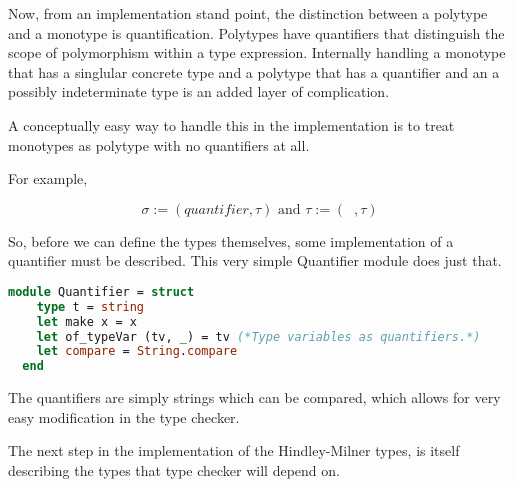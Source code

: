 \documentclass{l4proj}
\begin{document}


Now, from an implementation stand point, the distinction between a polytype and a monotype is quantification.
Polytypes have quantifiers that distinguish the scope of polymorphism within a type expression.
Internally handling a monotype that has a singlular concrete type and a polytype that has a quantifier and an a possibly indeterminate type is an added layer of complication.

A conceptually easy way to handle this in the implementation is to treat monotypes as polytype with no quantifiers at all.

For example,

\[\sigma := (quantifier, \tau) \text{ and } \tau := (\;\;, \tau)\]

So, before we can define the types themselves, some implementation of a quantifier must be described.
\newpage
This very simple Quantifier module does just that.

\begin{lstlisting}[language=Caml, caption=The PyFunc type checker's quantifier module.]
  module Quantifier = struct
    type t = string
    let make x = x
    let of_typeVar (tv, _) = tv (*Type variables as quantifiers.*)
    let compare = String.compare
  end
\end{lstlisting}

The quantifiers are simply strings which can be compared, which allows for very easy modification in the type checker.

The next step in the implementation of the Hindley-Milner types, is itself describing the types that type checker will depend on.
\end{document}
